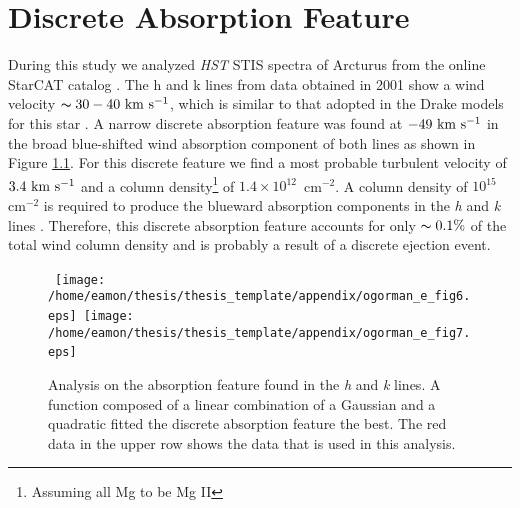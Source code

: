 
\chapter{Discrete Absorption Feature}\label{app:2}

During this study we analyzed \textit{HST} STIS spectra of Arcturus from the online StarCAT catalog \citep{ayres_2010}. The  h and k lines from data obtained in 2001 show a wind velocity $ \thicksim 30-40 \ \rm{km \ s^{-1}}$, which is similar to that adopted in the Drake models for this star \cite{drake_1985}. A narrow discrete absorption feature was found at $-49 \ \rm{km \ s^{-1}}$ in the broad blue-shifted wind absorption component of both lines as shown in Figure \ref{fig:app2}. For this discrete feature we find a most probable turbulent velocity of $ 3.4 \ \rm{km \ s^{-1}}$ and a  column density\footnote{Assuming all Mg to be Mg II} of $1.4\times10^{12}$\, cm$^{-2}$. A  column density of $10^{15}$\, cm$^{-2}$ is required to produce the blueward absorption components in the \textit{h} and \textit{k} lines \citep{mcclintock_1978}. Therefore, this discrete absorption feature accounts for only $\thicksim 0.1 \%$ of the total wind column density and is probably a result of a discrete ejection event.

\begin{figure}[hb!]
\centering 
\mbox{
          \texttt{[image: /home/eamon/thesis/thesis\_template/appendix/ogorman\_e\_fig6.eps]} 
          \texttt{[image: /home/eamon/thesis/thesis\_template/appendix/ogorman\_e\_fig7.eps]}
          }
\caption[]{Analysis on the absorption feature found in the  \textit{h} and \textit{k} lines. A function composed of a linear combination of a Gaussian and a quadratic fitted the discrete absorption feature the best. The red data in the upper row shows the data that is used in this analysis.}
\label{fig:app2}
\end{figure}